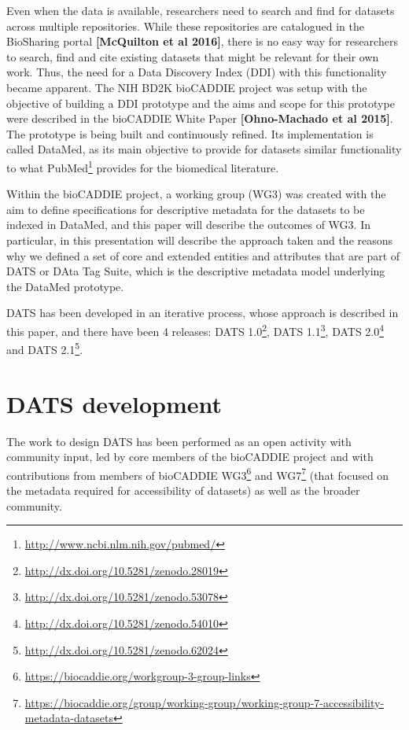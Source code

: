 \documentclass[runningheads,a4paper]{llncs}
\begin{document}
Even when the data is available, researchers need to search and find for datasets across multiple repositories. While these repositories are catalogued in the BioSharing portal {\bf [McQuilton et al 2016]}, there is no easy way for researchers to search, find and cite existing datasets that might be relevant for their own work. Thus, the need for a Data Discovery Index (DDI) with this functionality became apparent. The NIH BD2K bioCADDIE project was setup with the objective of building a DDI prototype and the aims and scope for this prototype were described in the bioCADDIE White Paper {\bf [Ohno-Machado et al 2015]}. The prototype is being built and continuously refined. Its implementation is called DataMed, as its main objective to provide for datasets similar functionality to what PubMed\footnote{\url{http://www.ncbi.nlm.nih.gov/pubmed/}} provides for the biomedical literature.



Within the bioCADDIE project, a working group (WG3) was created with the aim to define specifications for descriptive metadata for the datasets to be indexed in DataMed, and this paper will describe the outcomes of WG3. In particular, in this presentation will describe the approach taken and the reasons why we defined a set of core and extended entities and attributes that are part of DATS or DAta Tag Suite, which is the descriptive metadata model underlying the DataMed prototype. 

DATS has been developed in an iterative process, whose approach is described in this paper, and there have been 4 releases: DATS 1.0\footnote{\url{http://dx.doi.org/10.5281/zenodo.28019}}, DATS 1.1\footnote{\url{http://dx.doi.org/10.5281/zenodo.53078}}, DATS 2.0\footnote{\url{http://dx.doi.org/10.5281/zenodo.54010}} and DATS 2.1\footnote{\url{http://dx.doi.org/10.5281/zenodo.62024}}.

\section{DATS development}

The work to design DATS has been performed as an open activity with community input, led by core members of the bioCADDIE project and with contributions from members of bioCADDIE WG3\footnote{\url{https://biocaddie.org/workgroup-3-group-links}} and WG7\footnote{\url{https://biocaddie.org/group/working-group/working-group-7-accessibility-metadata-datasets}} (that focused on the metadata required for accessibility of datasets) as well as the broader community. 
\end{document}
